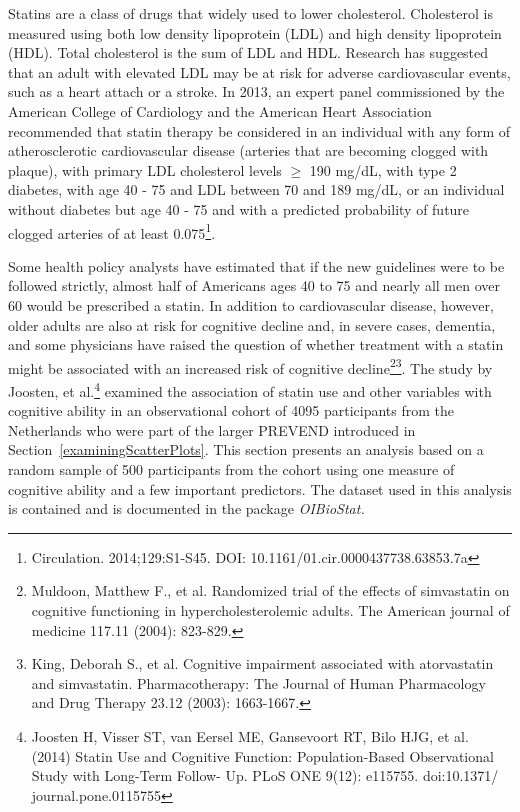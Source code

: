 Statins are a class of drugs that widely used to lower cholesterol. Cholesterol is measured using both low density lipoprotein (LDL) and high density lipoprotein (HDL).  Total cholesterol is the sum of LDL and HDL.  Research has suggested that an adult with elevated LDL may be at risk for adverse cardiovascular events, such as a heart attach or a stroke.  In 2013, an expert panel commissioned by the American College of Cardiology and the American Heart Association recommended that statin therapy be considered in an individual with any form of atherosclerotic cardiovascular disease (arteries that are becoming clogged with plaque), with primary LDL cholesterol levels $\ge$ 190 mg/dL, with type 2 diabetes, with age 40 - 75 and LDL between 70 and 189 mg/dL, or an individual without diabetes but age 40 - 75 and with a predicted probability of future clogged arteries of at least 0.075\footnote{Circulation. 2014;129:S1-S45. DOI: 10.1161/01.cir.0000437738.63853.7a}.

Some health policy analysts have estimated that if the new guidelines were to be followed strictly, almost half of Americans ages 40 to 75 and nearly all men over 60 would be prescribed a statin. In addition to cardiovascular disease, however, older adults are also at risk for cognitive decline and, in severe cases, dementia, and some physicians have raised the question of whether treatment with a statin might be associated with an increased risk of cognitive decline\footnote{Muldoon, Matthew F., et al. Randomized trial of the effects of simvastatin on cognitive functioning in hypercholesterolemic adults. The American journal of medicine 117.11 (2004): 823-829.}\footnote{King, Deborah S., et al. Cognitive impairment associated with atorvastatin and simvastatin. Pharmacotherapy: The Journal of Human Pharmacology and Drug Therapy 23.12 (2003): 1663-1667.}.  The study by Joosten, et al.\footnote{Joosten H, Visser ST, van Eersel ME, Gansevoort RT, Bilo HJG, et al. (2014) Statin Use and Cognitive Function: Population-Based Observational Study with Long-Term Follow- Up. PLoS ONE 9(12): e115755. doi:10.1371/ journal.pone.0115755} examined the association of statin use and other variables with cognitive ability in an observational cohort of 4095 participants from the Netherlands who were part of the larger PREVEND introduced in Section~\ref{examiningScatterPlots}.  This section presents an analysis based on a random sample of 500 participants from the cohort using one measure of cognitive ability and a few important predictors.  The dataset  used in this analysis is contained and is documented in the package \it{OIBioStat}.

